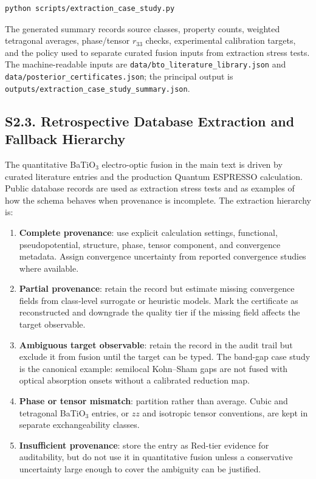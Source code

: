 \documentclass[onecolumn,superscriptaddress,amsmath,amssymb,longbibliography]{revtex4-2}
\begin{document}
\begin{verbatim}
python scripts/extraction_case_study.py
\end{verbatim}

The generated summary records source classes, property counts, weighted
tetragonal averages, phase/tensor $r_{33}$ checks, experimental calibration
targets, and the policy used to separate curated fusion inputs from extraction
stress tests. The machine-readable inputs are
\texttt{data/bto\_literature\_library.json} and
\texttt{data/posterior\_certificates.json}; the principal output is
\texttt{outputs/extraction\_case\_study\_summary.json}.


\subsection{S2.3. Retrospective Database Extraction and Fallback Hierarchy}

The quantitative BaTiO$_3$ electro-optic fusion in the main text is driven by
curated literature entries and the production Quantum ESPRESSO calculation.
Public database records are used as extraction stress tests and as examples of
how the schema behaves when provenance is incomplete. The extraction hierarchy
is:

\begin{enumerate}
    \item \textbf{Complete provenance}: use explicit calculation settings,
    functional, pseudopotential, structure, phase, tensor component, and
    convergence metadata. Assign convergence uncertainty from reported
    convergence studies where available.
    \item \textbf{Partial provenance}: retain the record but estimate missing
    convergence fields from class-level surrogate or heuristic models. Mark the
    certificate as reconstructed and downgrade the quality tier if the missing
    field affects the target observable.
    \item \textbf{Ambiguous target observable}: retain the record in the audit
    trail but exclude it from fusion until the target can be typed. The band-gap
    case study is the canonical example: semilocal Kohn--Sham gaps are not
    fused with optical absorption onsets without a calibrated reduction map.
    \item \textbf{Phase or tensor mismatch}: partition rather than average.
    Cubic and tetragonal BaTiO$_3$ entries, or $zz$ and isotropic tensor
    conventions, are kept in separate exchangeability classes.
    \item \textbf{Insufficient provenance}: store the entry as Red-tier
    evidence for auditability, but do not use it in quantitative fusion unless
    a conservative uncertainty large enough to cover the ambiguity can be
    justified.
\end{enumerate}
\end{document}
